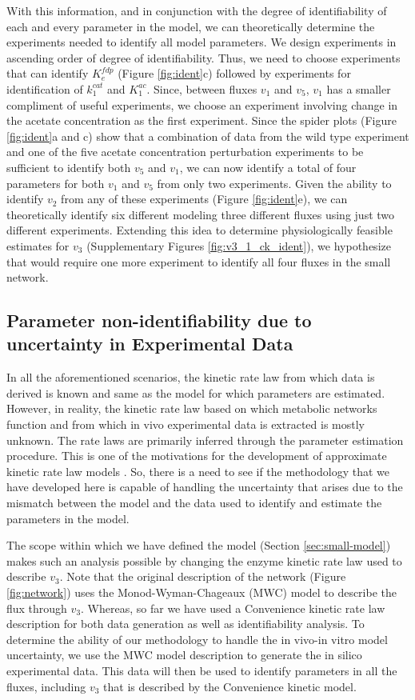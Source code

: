 \documentclass[10pt]{article}
\begin{document}
	With this information, and in conjunction with the degree of identifiability of each and every parameter in the model, we can theoretically determine the experiments needed to identify all model parameters. We design experiments in ascending order of degree of identifiability. Thus, we need to choose experiments that can identify $K_e^{fdp}$ (Figure \ref{fig:ident}c) followed by experiments for identification of $k_1^{cat}$ and $K_1^{ac}$. Since, between fluxes $v_1$ and $v_5$, $v_1$ has a smaller compliment of useful experiments, we choose an experiment involving change in the acetate concentration as the first experiment. Since the spider plots (Figure \ref{fig:ident}a and c) show that a combination of data from the wild type experiment and one of the five acetate concentration perturbation experiments to be sufficient to identify both $v_5$ and $v_1$, we can now identify a total of four parameters for both $v_1$ and $v_5$ from only two experiments. Given the ability to identify $v_2$ from any of these experiments (Figure \ref{fig:ident}e), we can theoretically identify six different modeling three different fluxes using just two different experiments. Extending this idea to determine physiologically feasible estimates for $v_3$ (Supplementary Figures \ref{fig:v3_1_ck_ident}), we hypothesize that would require one more experiment to identify all four fluxes in the small network. 
	
	\subsection{Parameter non-identifiability due to uncertainty in Experimental Data}\label{sec:uncertainty}
	In all the aforementioned scenarios, the kinetic rate law from which data is derived is known and same as the model for which parameters are estimated. However, in reality, the kinetic rate law based on which metabolic networks function and from which in vivo experimental data is extracted is mostly unknown. The rate laws are primarily inferred through the parameter estimation procedure. This is one of the motivations for the development of approximate kinetic rate law models \parencite{Heijnen2013,Smallbone2007,Berthoumieux2013}.
	So, there is a need to see if the methodology that we have developed here is capable of handling the uncertainty that arises due to the mismatch between the model and the data used to identify and estimate the parameters in the model.
	
	The scope within which we have defined the model (Section \ref{sec:small-model}) makes such an analysis possible by changing the enzyme kinetic rate law used to describe $v_3$. Note that the original description \parencite{Kotte2014,Srinivasan2017} of the network (Figure \ref{fig:network}) uses the Monod-Wyman-Chageaux (MWC) model to describe the flux through $v_3$. Whereas, so far we have used a Convenience kinetic rate law description for both data generation as well as identifiability analysis. To determine the ability of our methodology to handle the in vivo-in vitro model uncertainty, we use the MWC model description to generate the in silico experimental data. This data will then be used to identify parameters in all the fluxes, including $v_3$ that is described by the Convenience kinetic model.
	
\end{document}
